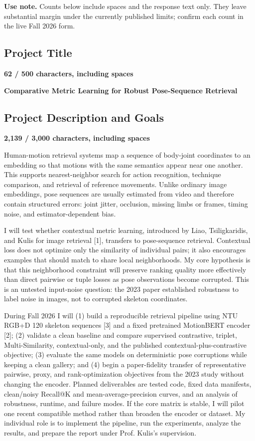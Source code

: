\documentclass[11pt,letterpaper]{article}
\newcommand{\CharCount}[2]{%
  \begin{flushright}
    \vspace{-7pt}
    {\color{Muted}\bfseries\footnotesize #1 / #2 characters, including spaces}
  \end{flushright}
  \vspace{-3pt}
}
\begin{document}
\textbf{Use note.}
Counts below include spaces and the response text only. They leave substantial margin under the currently published limits; confirm each count in the live Fall 2026 form.

\subsection*{Project Title}
\CharCount{62}{500}
\begin{titlebox}
\textbf{\color{DarkAccent}Comparative Metric Learning for Robust Pose-Sequence Retrieval}
\end{titlebox}

\subsection*{Project Description and Goals}
\CharCount{2,139}{3,000}

Human-motion retrieval systems map a sequence of body-joint coordinates to an embedding so that motions with the same semantics appear near one another. This supports nearest-neighbor search for action recognition, technique comparison, and retrieval of reference movements. Unlike ordinary image embeddings, pose sequences are usually estimated from video and therefore contain structured errors: joint jitter, occlusion, missing limbs or frames, timing noise, and estimator-dependent bias.

I will test whether contextual metric learning, introduced by Liao, Tsiligkaridis, and Kulis for image retrieval [1], transfers to pose-sequence retrieval. Contextual loss does not optimize only the similarity of individual pairs; it also encourages examples that should match to share local neighborhoods. My core hypothesis is that this neighborhood constraint will preserve ranking quality more effectively than direct pairwise or tuple losses as pose observations become corrupted. This is an untested input-noise question: the 2023 paper established robustness to label noise in images, not to corrupted skeleton coordinates.

During Fall 2026 I will (1) build a reproducible retrieval pipeline using NTU RGB+D 120 skeleton sequences [3] and a fixed pretrained MotionBERT encoder [2]; (2) validate a clean baseline and compare supervised contrastive, triplet, Multi-Similarity, contextual-only, and the published contextual-plus-contrastive objective; (3) evaluate the same models on deterministic pose corruptions while keeping a clean gallery; and (4) begin a paper-fidelity transfer of representative pairwise, proxy, and rank-optimization objectives from the 2023 study without changing the encoder. Planned deliverables are tested code, fixed data manifests, clean/noisy Recall@K and mean-average-precision curves, and an analysis of robustness, runtime, and failure modes. If the core matrix is stable, I will pilot one recent compatible method rather than broaden the encoder or dataset. My individual role is to implement the pipeline, run the experiments, analyze the results, and prepare the report under Prof. Kulis's supervision.
\end{document}
